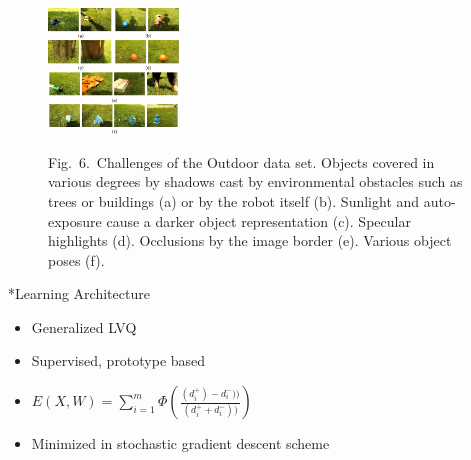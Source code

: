 \documentclass{article}
\makeatletter
\renewcommand{\section}{%
\@startsection{section}{1}{0pt}{3ex}{1ex}{%
\color[rgb]{0,0.4078,0.7059}%
\fontsize{13mm}{13mm}\sffamily\bfseries}}
\makeatother
\begin{document}
\begin{multicols}{3}
\begin{figure}[H]
\begin{center}
\includegraphics[width=0.31\textwidth]{Images/General/Challenges.png} 
\end{center}
{\myCaption Fig.~6.~Challenges of the Outdoor data set. Objects covered in various degrees
by shadows cast by environmental obstacles such as trees or buildings (a)
or by the robot itself (b). Sunlight and auto-exposure cause a darker object
representation (c). Specular highlights (d). Occlusions by the image border
(e). Various object poses (f).}
\end{figure}




\section*{Learning Architecture}

\begin{minipage}[c]{0.6\linewidth}
\begin{itemize}
	\item Generalized LVQ \cite{SO95} 
	\item Supervised, prototype based
	\item $E(X, W)=\sum_{i=1}^{m} \Phi(\frac{(d^+_i)-d^-_i))}{(d^+_i+d^-_i))})$
	\item Minimized in stochastic gradient descent scheme
\end{itemize}


\end{minipage}
\end{multicols}
\end{document}
